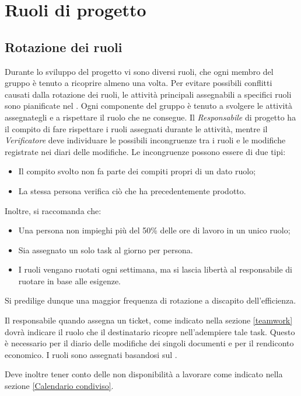 \section{Ruoli di progetto}
\subsection{Rotazione dei ruoli}
\label{rotazioneruoli}
Durante lo sviluppo del progetto vi sono diversi ruoli, che ogni membro del gruppo \GroupName{} è tenuto a ricoprire almeno una volta. Per evitare possibili conflitti causati dalla rotazione dei ruoli, le attività principali assegnabili a specifici ruoli sono pianificate nel \PianoDiProgetto. Ogni componente del gruppo è tenuto a svolgere le attività assegnategli e a rispettare il ruolo che ne consegue. Il \textit{Responsabile} di progetto ha il compito di fare rispettare i ruoli assegnati durante le attività, mentre il \textit{Verificatore} deve individuare le possibili incongruenze tra i ruoli e le modifiche registrate nei diari delle modifiche.
Le incongruenze possono essere di due tipi:
\begin{itemize}
\item Il compito svolto non fa parte dei compiti propri di un dato ruolo;
\item La stessa persona verifica ciò che ha precedentemente prodotto.
\end{itemize}

Inoltre, si raccomanda che:
\begin{itemize}
\item Una persona non impieghi più del 50\% delle ore di lavoro in un unico ruolo;
\item Sia assegnato un solo task al giorno per persona.
\item I ruoli vengano ruotati ogni settimana, ma si lascia libertà al responsabile di ruotare in base alle esigenze.
\end{itemize}

Si predilige dunque una maggior frequenza di rotazione a discapito dell'efficienza.

Il responsabile quando assegna un ticket, come indicato nella sezione \ref{teamwork} dovrà indicare il ruolo che il destinatario ricopre nell'adempiere tale task. Questo è necessario per il diario delle modifiche dei singoli documenti e per il rendiconto economico. I ruoli sono assegnati basandosi sul \PianoDiProgetto. 

Deve inoltre tener conto delle non disponibilità a lavorare come indicato nella sezione \ref{Calendario condiviso}.

